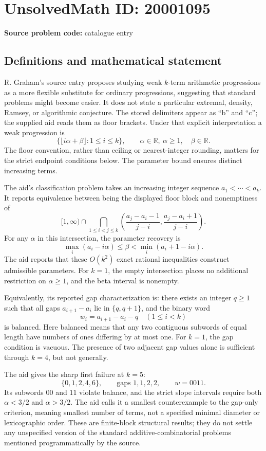 \documentclass[11pt]{article}
\newcommand{\R}{\mathbb{R}}
\begin{document}
\section*{UnsolvedMath ID: 20001095}
\textbf{Source problem code:} catalogue entry
\subsection{Definitions and mathematical statement}
R. Graham's source entry proposes studying weak \(k\)-term arithmetic progressions as a more flexible substitute for ordinary progressions, suggesting that standard problems might become easier. It does not state a particular extremal, density, Ramsey, or algorithmic conjecture. The stored delimiters appear as ``b'' and ``c''; the supplied aid reads them as floor brackets. Under that explicit interpretation a weak progression is
\[
 \{\lfloor i\alpha+\beta\rfloor:1\le i\le k\},
 \qquad \alpha\in\R,\ \alpha\ge1,\quad\beta\in\R.
\]
The floor convention, rather than ceiling or nearest-integer rounding, matters for the strict endpoint conditions below. The parameter bound ensures distinct increasing terms.

The aid's classification problem takes an increasing integer sequence \(a_1<\cdots<a_k\). It reports equivalence between being the displayed floor block and nonemptiness of
\[
 [1,\infty)\cap\bigcap_{1\le i<j\le k}
 \left(\frac{a_j-a_i-1}{j-i},\frac{a_j-a_i+1}{j-i}\right).
\]
For any \(\alpha\) in this intersection, the parameter recovery is
\[
 \max_i(a_i-i\alpha)\le\beta<\min_i(a_i+1-i\alpha).
\]
The aid reports that these \(O(k^2)\) exact rational inequalities construct admissible parameters. For \(k=1\), the empty intersection places no additional restriction on \(\alpha\ge1\), and the beta interval is nonempty.

Equivalently, its reported gap characterization is: there exists an integer \(q\ge1\) such that all gaps \(a_{i+1}-a_i\) lie in \(\{q,q+1\}\), and the binary word
\[
 w_i=a_{i+1}-a_i-q\quad(1\le i<k)
\]
is balanced. Here balanced means that any two contiguous subwords of equal length have numbers of ones differing by at most one. For \(k=1\), the gap condition is vacuous. The presence of two adjacent gap values alone is sufficient through \(k=4\), but not generally.

The aid gives the sharp first failure at \(k=5\):
\[
 \{0,1,2,4,6\},\qquad\text{gaps }1,1,2,2,\qquad w=0011.
\]
Its subwords \(00\) and \(11\) violate balance, and the strict slope intervals require both \(\alpha<3/2\) and \(\alpha>3/2\). The aid calls it a smallest counterexample to the gap-only criterion, meaning smallest number of terms, not a specified minimal diameter or lexicographic order. These are finite-block structural results; they do not settle any unspecified version of the standard additive-combinatorial problems mentioned programmatically by the source.
\end{document}
